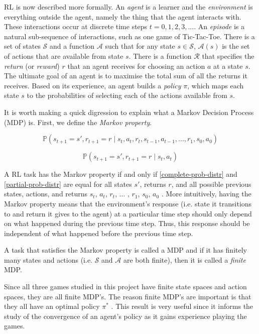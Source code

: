 \documentclass[11pt,a4paper,twoside,openright]{report}
\begin{document}
RL is now described more formally. An \emph{agent} is a learner and the \emph{environment} is everything outside the agent, namely the thing that the agent interacts with. These interactions occur at discrete time steps $t = 0, 1, 2, 3, ...$. An \emph{episode} is a natural sub-sequence of interactions, such as one game of Tic-Tac-Toe. There is a set of states $\mathcal{S}$ and a function $\mathcal{A}$ such that for any state $s \in \mathcal{S}$, $\mathcal{A}(s)$ is the set of actions that are available from state $s$. There is a function $\mathcal{R}$ that specifies the \emph{return} (or \emph{reward}) $r$ that an agent receives for choosing an action $a$ at a state $s$. The ultimate goal of an agent is to maximise the total sum of all the returns it receives. Based on its experience, an agent builds a \emph{policy} $\pi$, which maps each state $s$ to the probabilities of selecting each of the actions available from $s$.

It is worth making a quick digression to explain what a Markov Decision Process (MDP) is. First, we define the \emph{Markov property}.

\begin{equation}
	\mathbb{P}(s_{t+1} = s', r_{t+1} = r \mid s_t, a_t, r_t, s_{t-1}, a_{t-1}, ... , r_1, s_0, a_0)
 \label{complete-prob-distr}
\end{equation}

\begin{equation}
	\mathbb{P}(s_{t+1} = s', r_{t+1} = r \mid s_t, a_t) \label{partial-prob-distr}
\end{equation}

A RL task has the Markov property if and only if \ref{complete-prob-distr} and \ref{partial-prob-distr} are equal for all states $s'$, returns $r$, and all possible previous states, actions, and returns $s_t$, $a_t$, $r_t$, ... , $r_1$, $s_0$, $a_0$ \cite{rl-book}. More intuitively, having the Markov property means that the environment's response (i.e. state it transitions to and return it gives to the agent) at a particular time step should only depend on what happened during the previous time step. Thus, this response should be independent of what happened before the previous time step.

A task that satisfies the Markov property is called a MDP and if it has finitely many states and actions (i.e. $\mathcal{S}$ and $\mathcal{A}$ are both finite), then it is called a \emph{finite} MDP. 

Since all three games studied in this project have finite state spaces and action spaces, they are all finite MDP's. The reason finite MDP's are important is that they all have an optimal policy $\pi^{\ast}$ \cite{rl-book} \cite{mdp-convergence}. This result is very useful since it informs the study of the convergence of an agent's policy as it gains experience playing the games.
\end{document}
